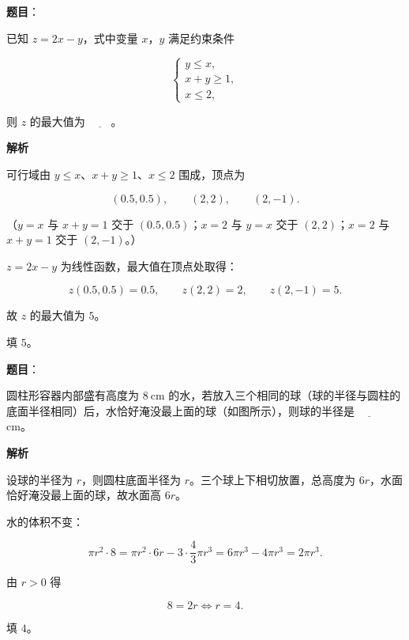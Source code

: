 \begin{answer}

\textbf{题目}：

已知 $z=2x-y$，式中变量 $x$，$y$ 满足约束条件

\nopagebreak[4]
\[\begin{cases}y\leqslant x,\\ x+y\geqslant1,\\ x\leqslant2,\end{cases}\]

则 $z$ 的最大值为 $\underline{\qquad}$。

\textbf{解析}

可行域由 $y\leqslant x$、$x+y\geqslant1$、$x\leqslant2$ 围成，顶点为

\nopagebreak[4]
\[(0.5,0.5),\qquad (2,2),\qquad (2,-1).\]

（$y=x$ 与 $x+y=1$ 交于 $(0.5,0.5)$；$x=2$ 与 $y=x$ 交于 $(2,2)$；$x=2$ 与 $x+y=1$ 交于 $(2,-1)$。）

$z=2x-y$ 为线性函数，最大值在顶点处取得：

\nopagebreak[4]
\[z(0.5,0.5)=0.5,\qquad z(2,2)=2,\qquad z(2,-1)=5.\]

故 $z$ 的最大值为 $5$。

填 $5$。


\end{answer}
\begin{answer}

\textbf{题目}：

圆柱形容器内部盛有高度为 $8\ \mathrm{cm}$ 的水，若放入三个相同的球（球的半径与圆柱的底面半径相同）后，水恰好淹没最上面的球（如图所示），则球的半径是 $\underline{\qquad}$ cm。
\nopagebreak[4]
\begin{center}\end{center}
\nopagebreak[4]
\textbf{解析}

设球的半径为 $r$，则圆柱底面半径为 $r$。三个球上下相切放置，总高度为 $6r$，水面恰好淹没最上面的球，故水面高 $6r$。

水的体积不变：

\nopagebreak[4]
\[\pi r^2\cdot8=\pi r^2\cdot6r-3\cdot\frac43\pi r^3=6\pi r^3-4\pi r^3=2\pi r^3.\]

由 $r>0$ 得

\nopagebreak[4]
\[8=2r\iff r=4.\]

填 $4$。


\end{answer}
